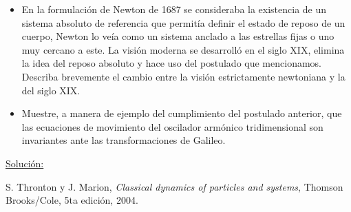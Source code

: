 \documentclass[a4paper,10pt]{article}
\begin{document}
\begin{itemize}
 \item En la formulación de Newton de 1687 se consideraba la existencia de un sistema 
 absoluto de referencia que permitía definir el estado de reposo de un cuerpo, Newton lo
 veía como un sistema anclado a las estrellas fijas o uno muy cercano a este. La visión 
 moderna se desarrolló en el siglo XIX, elimina la idea del reposo absoluto y hace 
 uso del postulado que mencionamos. Describa brevemente el cambio entre la visión 
 estrictamente newtoniana y la del siglo XIX.
 \item Muestre, a manera de ejemplo del cumplimiento del postulado anterior, que las 
 ecuaciones de movimiento del oscilador armónico tridimensional son invariantes ante
 las transformaciones de Galileo.
\end{itemize}

\vspace{.3cm}

\underline{Solución:}

\vspace{.3cm}

\begin{thebibliography}{10}
 S. Thronton y J. Marion, \textit{Classical dynamics of particles and systems}, Thomson Brooks/Cole,
 5ta edición, 2004.
\end{thebibliography}
\end{document}
